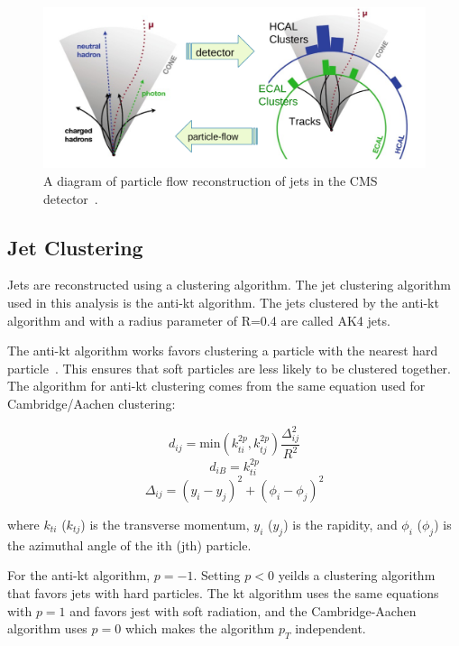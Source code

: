 \begin{figure}[h]
\centering
\includegraphics[width=1.0\textwidth]{figures/particle_flow_pandolfi}
\caption{A diagram of particle flow reconstruction of jets in the CMS detector~\cite{pflow_pandolfi}.}
\label{fig:pflow_jets}
\end{figure}



\subsection*{Jet Clustering}


Jets are reconstructed using a clustering algorithm. The jet clustering algorithm used in this analysis is the anti-kt algorithm. The jets clustered by the anti-kt algorithm and with a radius parameter of R=0.4 are called AK4 jets.

The anti-kt algorithm works favors clustering a particle with the nearest hard particle~\cite{anti-kt}. This ensures that soft particles are less likely to be clustered together. The algorithm for anti-kt clustering comes from the same equation used for Cambridge/Aachen clustering:

\begin{equation}
	d_{ij} = \text{min} \left( k^{2p}_{ti}, k^{2p}_{tj} \right) \frac{\Delta^2_{ij}}{R^2}
\end{equation}
\begin{equation}
	d_{iB} = k^{2p}_{ti}
\end{equation}
\begin{equation}
	\Delta_{ij} = (y_i - y_j)^2 + (\phi_i - \phi_j)^2
\end{equation}

where $k_{ti}$ ($k_{tj}$) is the transverse momentum, $y_i$ ($y_j$) is the rapidity, and $\phi_i$ ($\phi_j$) is the azimuthal angle of the ith (jth) particle.

For the anti-kt algorithm, $p=-1$. Setting $p<0$ yeilds a clustering algorithm that favors jets with hard particles. The kt algorithm uses the same equations with $p=1$ and favors jest with soft radiation, and the Cambridge-Aachen algorithm uses $p=0$ which makes the algorithm $p_T$ independent.

